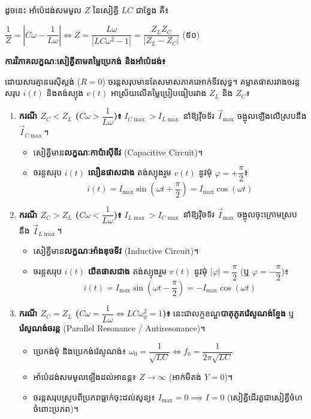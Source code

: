 \vspace{0.3em}
\noindent
ដូចនេះ អាំប៉េដង់សមមូល $Z$ នៃសៀគ្វី $LC$ ជាខ្នែង គឺ៖
\begin{center}
	$\boxed{\dfrac{1}{Z} = \left| C\omega - \dfrac{1}{L\omega} \right| \iff Z = \dfrac{L\omega}{|LC\omega^2 - 1|} = \dfrac{Z_L Z_C}{|Z_L - Z_C|}}$ \quad (៥០)
\end{center}

\vspace{0.5em}
\noindent
\textbf{ការវិភាគលក្ខណៈសៀគ្វីតាមតម្លៃប្រេកង់ និងអាំប៉េដង់៖}

\noindent
ដោយសារគ្មានរេស៊ីស្តង់ ($R = 0$) ចរន្តសរុបមានតែសមាសភាគរេអាក់ទីវសុទ្ធ។ គម្លាតផាសរវាងចរន្តសរុប $i(t)$ និងតង់ស្យុង $v(t)$ អាស្រ័យលើតម្លៃប្រៀបធៀបរវាង $Z_L$ និង $Z_C$៖
\begin{enumerate}[label=\textbf{\arabic*.} ,itemsep=3pt, topsep=1pt, parsep=0pt, leftmargin=1.6em]
	\item \textbf{ករណី $Z_C < Z_L$ ($C\omega > \dfrac{1}{L\omega}$)៖} $I_{C\max} > I_{L\max}$ នាំឱ្យវ៉ិចទ័រ $\vec{I}_{\max}$ ចង្អុលឡើងលើស្របនឹង $\vec{I}_{C\max}$។
	\begin{itemize}[itemsep=1pt, topsep=1pt, leftmargin=1.2em]
		\item សៀគ្វីមាន\textbf{លក្ខណៈកាប៉ាស៊ីទីវ} ({\englishfont Capacitive Circuit})។
		\item ចរន្តសរុប $i(t)$ \textbf{លឿនផាសជាង} តង់ស្យុងរួម $v(t)$ នូវមុំ $\varphi = +\dfrac{\pi}{2}$៖
		\[ i(t) = I_{\max}\sin\left(\omega t + \dfrac{\pi}{2}\right) = I_{\max}\cos(\omega t) \]
	\end{itemize}
	\pagebreak
	\item \textbf{ករណី $Z_C > Z_L$ ($C\omega < \dfrac{1}{L\omega}$)៖} $I_{L\max} > I_{C\max}$ នាំឱ្យវ៉ិចទ័រ $\vec{I}_{\max}$ ចង្អុលចុះក្រោមស្របនឹង $\vec{I}_{L\max}$។
	\begin{itemize}[itemsep=1pt, topsep=1pt, leftmargin=1.2em]
		\item សៀគ្វីមាន\textbf{លក្ខណៈអាំងឌុចទីវ} ({\englishfont Inductive Circuit})។
		\item ចរន្តសរុប $i(t)$ \textbf{យឺតផាសជាង} តង់ស្យុងរួម $v(t)$ នូវមុំ $|\varphi| = \dfrac{\pi}{2}$ (ឬ $\varphi = -\dfrac{\pi}{2}$)៖
		\[ i(t) = I_{\max}\sin\left(\omega t - \dfrac{\pi}{2}\right) = -I_{\max}\cos(\omega t) \]
	\end{itemize}
	\item \textbf{ករណី $Z_C = Z_L$ ($C\omega = \dfrac{1}{L\omega} \iff LC\omega_0^2 = 1$)៖} នេះជាលក្ខខណ្ឌ\textbf{បាតុភូតរ៉េសូណង់ខ្នែង} ឬ \textbf{រ៉េសូណង់ចរន្ត} ({\englishfont Parallel Resonance / Antiresonance})។
	\begin{itemize}[itemsep=1pt, topsep=1pt, leftmargin=1.2em]
		\item ប្រេកង់មុំ និងប្រេកង់រ៉េសូណង់៖ $\omega_0 = \dfrac{1}{\sqrt{LC}} \iff f_0 = \dfrac{1}{2\pi\sqrt{LC}}$
		\item អាំប៉េដង់សមមូលឡើងដល់អានន្ត៖ $Z \to \infty$ (អាក់មីតង់ $Y = 0$)។
		\item ចរន្តសរុបស្រូបពីប្រភពធ្លាក់ចុះដល់សូន្យ៖ $I_{\max} = 0 \implies I = 0$ (សៀគ្វីដើរតួជាសៀគ្វីចំហចំពោះប្រភព)។
	\end{itemize}
\end{enumerate}

